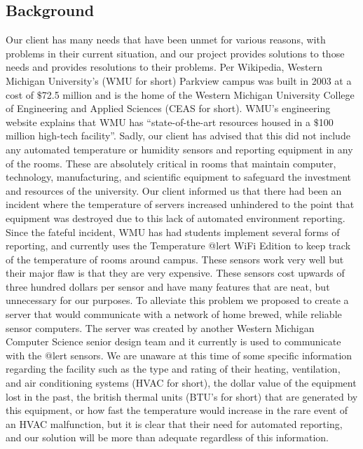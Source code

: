 \documentclass{report}
\begin{document}
\subsection*{Background}
Our client has many needs that have been unmet for various reasons, with problems in their current situation, and our project provides solutions to those needs and provides resolutions to their problems.
\newline
\indent
Per Wikipedia, Western Michigan University's (WMU for short) Parkview campus was built in 2003 at a cost of $\$$72.5 million and is the home of the Western Michigan University College of Engineering and Applied Sciences (CEAS for short). 
 WMU’s engineering website explains that WMU has “state-of-the-art resources housed in a $\$$100 million high-tech facility”. 
Sadly, our client has advised that this did not include any automated temperature or humidity sensors and reporting equipment in any of the rooms. 
 These are absolutely critical in rooms that maintain computer, technology, manufacturing, and scientific equipment to safeguard the investment and resources of the university.
 Our client informed us that there had been an incident where the temperature of servers increased unhindered to the point that equipment was destroyed due to this lack of automated environment reporting.
Since the fateful incident, WMU has had students implement several forms of reporting, and currently uses the Temperature @lert WiFi Edition to keep track of the temperature of rooms around campus. 
These sensors work very well but their major flaw is that they are very expensive. These sensors cost upwards of three hundred dollars per sensor and have many features that are neat, but unnecessary for our purposes. 
To alleviate this problem we proposed to create a server that would communicate with a network of home brewed, while reliable sensor computers. 
The server was created by another Western Michigan Computer Science senior design team and it currently is used to communicate with the @lert sensors.
\newline
\indent  
We are unaware at this time of some specific information regarding the facility such as the type and rating of their heating, ventilation, and air conditioning systems (HVAC for short), the dollar value of the equipment lost in the past, the british thermal units (BTU’s for short) that are generated by this equipment, or how fast the temperature would increase in the rare event of an HVAC malfunction, but it is clear that their need for automated reporting, and our solution will be more than adequate regardless of this information. 
\end{document}
